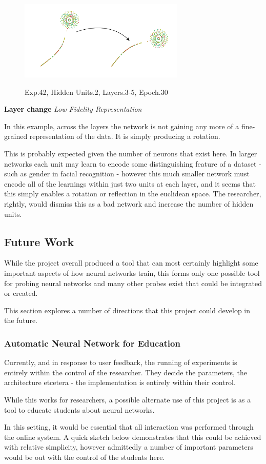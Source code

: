 \documentclass[a4paper,11pt,titlepage]{article}
\begin{document}
	\begin{figure}[H]
    			\centering	
			{{\includegraphics[width=0.7\textwidth]
    				{img/conc-X42_H2_L3-5_E30.png} 
    			}}%
    			\caption{Exp.42, Hidden Units.2, Layers.3-5, Epoch.30}%
    		\label{fig:mnistHinton}
	\end{figure}
	
	\textbf{Layer change} \textit{Low Fidelity Representation}
	\par 
	In this example, across the layers the network is not gaining any more of a fine-grained representation of the data. It is simply producing a rotation.
	\par 
	This is probably expected given the number of neurons that exist here. In larger networks each unit may learn to encode some distinguishing feature of a dataset - such as gender in facial recognition - however this much smaller network must encode all of the learnings within just two units at each layer, and it seems that this simply enables a rotation or reflection in the euclidean space. The researcher, rightly, would dismiss this as a bad network and increase the number of hidden units.

\subsection{Future Work}
	While the project overall produced a tool that can most certainly highlight some important aspects of how neural networks train, this forms only one possible tool for probing neural networks and many other probes exist that could be integrated or created.
	\par 
	This section explores a number of directions that this project could develop in the future.

	\subsubsection{Automatic Neural Network for Education}		
	Currently, and in response to user feedback, the running of experiments is entirely within the control of the researcher. They decide the parameters, the architecture etcetera - the implementation is entirely within their control.
	\par 
	While this works for researchers, a possible alternate use of this project is as a tool to educate students about neural networks.
	\par 
	In this setting, it would be essential that all interaction was performed through the online system. A quick sketch below demonstrates that this could be achieved with relative simplicity, however admittedly a number of important parameters would be out with the control of the students here.
	
\end{document}
